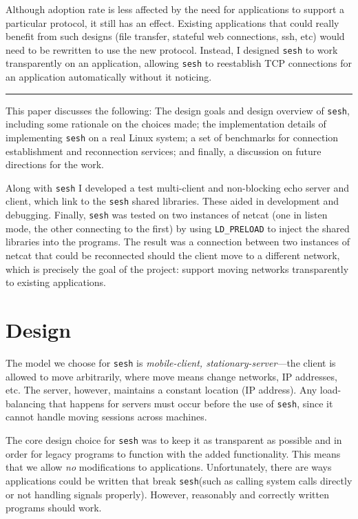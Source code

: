 \documentclass[twocolumn,11pt]{article}
\newcommand{\sesh}{\texttt{sesh}\xspace}
\begin{document}
Although adoption rate is less affected by the need for applications to support
a particular protocol, it still has an effect. Existing applications that could
really benefit from such designs (file transfer, stateful web connections, ssh,
etc) would need to be rewritten to use the new protocol. Instead, I designed
\sesh to work transparently on an application, allowing \sesh to
reestablish TCP connections for an application automatically without it noticing.

\begin{center}\rule{2cm}{0.1pt}\end{center}

This paper discusses the following: The design goals and design overview of
\sesh, including some rationale on the choices made; the implementation details
of implementing \sesh on a real Linux system; a set of benchmarks for connection
establishment and reconnection services; and finally, a discussion on future
directions for the work.

Along with \sesh I developed a test multi-client and non-blocking echo server
and client, which link to the \sesh shared libraries. These aided in development
and debugging. Finally, \sesh was tested on two instances of netcat (one in
listen mode, the other connecting to the first) by using \texttt{LD\_PRELOAD} to
inject the shared libraries into the programs. The result was a connection
between two instances of netcat that could be reconnected should the client move
to a different network, which is precisely the goal of the project: support
moving networks transparently to existing applications.

\section{Design}

The model we choose for \sesh is \textit{mobile-client, stationary-server}---the
client is allowed to move arbitrarily, where move means change networks, IP
addresses, etc. The server, however, maintains a constant location (IP address).
Any load-balancing that happens for servers must occur before the use of \sesh,
since it cannot handle moving sessions across machines.

The core design choice for \sesh was to keep it as transparent as possible and
in order for legacy programs to function with the added functionality. This
means that we allow \textit{no} modifications to applications. Unfortunately,
there are ways applications could be written that break \sesh (such as calling
system calls directly or not handling signals properly). However, reasonably and
correctly written programs should work.
\end{document}
